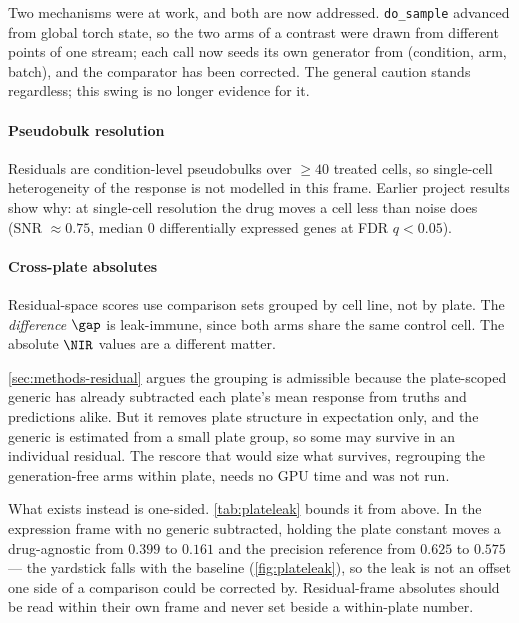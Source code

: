 Two mechanisms were at work, and both are now addressed. \texttt{do\_sample}
advanced from global torch state, so the two arms of a contrast were drawn from
different points of one
stream; each call now seeds its own generator from (condition, arm, batch), and
the comparator has been corrected. The general caution stands regardless; this
swing is no longer evidence for it.

\paragraph{Pseudobulk resolution} Residuals are condition-level pseudobulks over
$\geq 40$ treated cells, so single-cell heterogeneity of the response is not
modelled in this frame. Earlier project results show why: at single-cell
resolution the drug moves a cell less than noise does (SNR $\approx 0.75$,
median $0$ differentially expressed genes at FDR $q<0.05$).

\paragraph{Cross-plate absolutes} Residual-space scores use comparison sets
grouped by cell line, not by plate. The \emph{difference} $\gap$ is leak-immune,
since both arms share the same control cell. The absolute $\NIR$ values are a
different matter.

\cref{sec:methods-residual} argues the grouping is admissible because the
plate-scoped generic has already subtracted each plate's mean response from
truths and predictions alike. But it removes plate structure in expectation
only, and the generic is estimated from a small plate group, so some may survive
in an individual residual. The rescore that would size what survives, regrouping
the generation-free arms within plate, needs no GPU time and was not run.

What exists instead is one-sided. \cref{tab:plateleak} bounds it from
above. In the expression frame with no
generic subtracted, holding the plate constant moves a drug-agnostic
 from
$0.399$ to $0.161$ and the precision reference from $0.625$ to $0.575$ --- the
yardstick falls with the baseline (\cref{fig:plateleak}), so the leak is not an
offset one side of a comparison could be corrected by.
Residual-frame absolutes should be read within their own frame and never set
beside a within-plate number.

